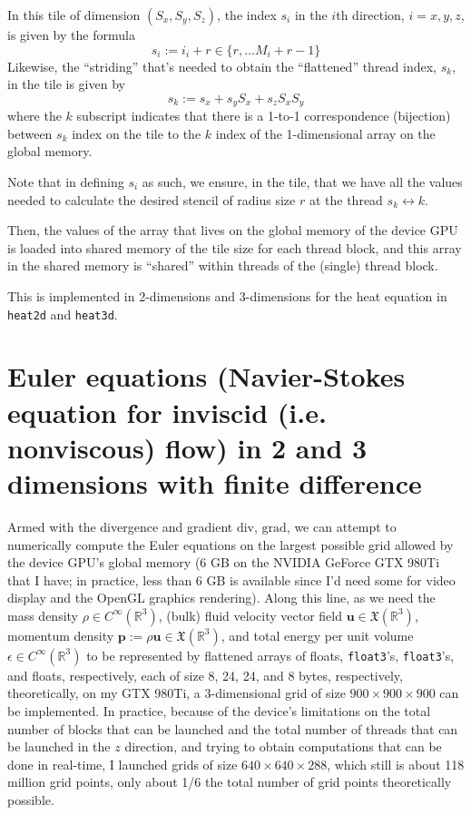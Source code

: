 \documentclass[10pt]{amsart}
\begin{document}
In this tile of dimension $(S_x,S_y,S_z)$, the index $s_i$ in the $i$th direction, $i=x,y,z$, is given by the formula
\[
s_i := i_i + r\in \lbrace r, \dots M_i + r-1\rbrace
\]
Likewise, the ``striding'' that's needed to obtain the ``flattened'' thread index, $s_k$, in the tile is given by
\[
s_k := s_x + s_y S_x + s_z S_x S_y 
\]
where the $k$ subscript indicates that there is a 1-to-1 correspondence (bijection) between $s_k$ index on the tile to the $k$ index of the 1-dimensional array on the global memory.  

Note that in defining $s_i$ as such, we ensure, in the tile, that we have all the values needed to calculate the desired stencil of radius size $r$ at the thread $s_k \leftrightarrow k$.  

Then, the values of the array that lives on the global memory of the device GPU is loaded into shared memory of the tile size for each thread block, and this array in the shared memory is ``shared'' within threads of the (single) thread block.  

This is implemented in 2-dimensions and 3-dimensions for the heat equation in \verb|heat2d| and \verb|heat3d|.  

\section{Euler equations (Navier-Stokes equation for inviscid (i.e. nonviscous) flow) in 2 and 3 dimensions with finite difference}

Armed with the divergence and gradient $\text{div}$, $\text{grad}$, we can attempt to numerically compute the Euler equations on the largest possible grid allowed by the device GPU's global memory (6 GB on the NVIDIA GeForce GTX 980Ti that I have; in practice, less than 6 GB is available since I'd need some for video display and the OpenGL graphics rendering).  Along this line, as we need the mass density $\rho \in C^{\infty}(\mathbb{R}^3)$, (bulk) fluid velocity vector field $\mathbf{u} \in \mathfrak{X}(\mathbb{R}^3)$, momentum density $\mathbf{p} := \rho \mathbf{u} \in \mathfrak{X}(\mathbb{R}^3)$, and total energy per unit volume $\epsilon \in C^{\infty}(\mathbb{R}^3)$ to be represented by flattened arrays of floats, \verb|float3|'s, \verb|float3|'s, and floats, respectively, each of size 8, 24, 24, and 8 bytes, respectively, theoretically, on my GTX 980Ti, a 3-dimensional grid of size $900\times 900 \times 900$ can be implemented.  In practice, because of the device's limitations on the total number of blocks that can be launched and the total number of threads that can be launched in the $z$ direction, and trying to obtain computations that can be done in real-time, I launched grids of size $640 \times 640 \times 288$, which still is about 118 million grid points, only about 1/6 the total number of grid points theoretically possible.
\end{document}
